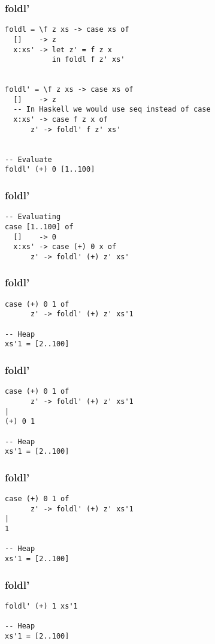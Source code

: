 \documentclass{beamer}
\begin{document}
\begin{frame}[t,fragile]
\frametitle{foldl'}
\begin{verbatim}
foldl = \f z xs -> case xs of
  []    -> z
  x:xs' -> let z' = f z x
           in foldl f z' xs'


foldl' = \f z xs -> case xs of
  []    -> z
  -- In Haskell we would use seq instead of case
  x:xs' -> case f z x of
      z' -> foldl' f z' xs'


-- Evaluate
foldl' (+) 0 [1..100]           
\end{verbatim}
\end{frame}

\begin{frame}[t,fragile]
\frametitle{foldl'}
\begin{verbatim}
-- Evaluating
case [1..100] of
  []    -> 0
  x:xs' -> case (+) 0 x of
      z' -> foldl' (+) z' xs'
\end{verbatim}
\end{frame}

\begin{frame}[t,fragile]
\frametitle{foldl'}
\begin{verbatim}
case (+) 0 1 of
      z' -> foldl' (+) z' xs'1

-- Heap
xs'1 = [2..100]      
\end{verbatim}
\end{frame}

\begin{frame}[t,fragile]
\frametitle{foldl'}
\begin{verbatim}
case (+) 0 1 of
      z' -> foldl' (+) z' xs'1
|
(+) 0 1      

-- Heap
xs'1 = [2..100]      
\end{verbatim}
\end{frame}

\begin{frame}[t,fragile]
\frametitle{foldl'}
\begin{verbatim}
case (+) 0 1 of
      z' -> foldl' (+) z' xs'1
|
1

-- Heap
xs'1 = [2..100]      
\end{verbatim}
\end{frame}

\begin{frame}[t,fragile]
\frametitle{foldl'}
\begin{verbatim}
foldl' (+) 1 xs'1

-- Heap
xs'1 = [2..100]      
\end{verbatim}
\end{frame}
\end{document}
